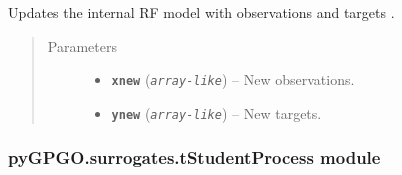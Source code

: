 \documentclass[letterpaper,10pt,english]{sphinxmanual}
\begin{document}
\begin{fulllineitems}

\begin{fulllineitems}
\label{pyGPGO.surrogates.RandomForest:pyGPGO.surrogates.RandomForest.RandomForest.update}
Updates the internal RF model with observations  and targets .
\begin{quote}\begin{description}
\item[{Parameters}] \leavevmode\begin{itemize}
\item {} 
\textbf{\texttt{xnew}} (\emph{\texttt{array-like}}) -- New observations.

\item {} 
\textbf{\texttt{ynew}} (\emph{\texttt{array-like}}) -- New targets.

\end{itemize}

\end{description}\end{quote}

\end{fulllineitems}


\end{fulllineitems}



\subsubsection{pyGPGO.surrogates.tStudentProcess module}
\label{pyGPGO.surrogates.tStudentProcess:module-pyGPGO.surrogates.tStudentProcess}\label{pyGPGO.surrogates.tStudentProcess:pygpgo-surrogates-tstudentprocess-module}\label{pyGPGO.surrogates.tStudentProcess::doc}
\end{document}
